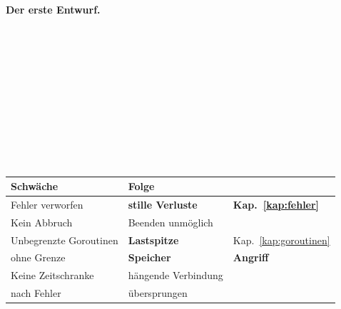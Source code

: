 \begin{merksatz}
\textbf{Der erste Entwurf.}

\begin{center}
\begin{minipage}{0.92\textwidth}
\\
\\
\\
\\
\\
\\
\\
\\
\code{\ \ \ \ \ \ \ \ \}()}\\
\code{\ \ \ \ \}}\\
\code{\}}
\end{minipage}
\end{center}

\begin{center}
{\small
\renewcommand{\arraystretch}{1.45}
\begin{tabular}{@{}P{3.0cm}P{2.6cm}P{2.4cm}@{}}
\toprule
\textbf{Schwäche} & \textbf{Folge} & \\
\midrule
Fehler verworfen & \textcolor{akzent}{\textbf{stille Verluste}} & \textbf{Kap.~\ref{kap:fehler}}\\
Kein Abbruch & \textcolor{akzent}{Beenden unmöglich} & \\
Unbegrenzte Goroutinen & \textcolor{akzent}{\textbf{Lastspitze}} & \textcolor{akzent}{Kap.~\ref{kap:goroutinen}}\\
 ohne Grenze & \textcolor{akzent}{\textbf{Speicher}} & \textcolor{akzent}{\textbf{Angriff}}\\
Keine Zeitschranke & \textcolor{akzent}{hängende Verbindung} & \\
 nach Fehler & \textcolor{akzent}{übersprungen} & \\
\bottomrule
\end{tabular}}
\end{center}

\begin{center}
\begin{minipage}{0.88\textwidth}
\end{minipage}
\end{center}


\end{merksatz}
